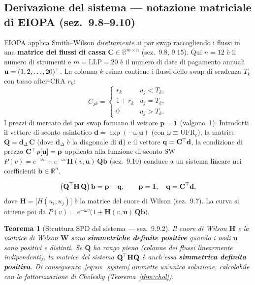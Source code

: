 \documentclass[11pt,a4paper]{article}
\theoremstyle{plain}
\newtheorem{teorema}{Teorema}[section]
\theoremstyle{definition}
\theoremstyle{remark}
\newcommand{\R}{\mathbb{R}}
\newcommand{\UFR}{\mathrm{UFR}}
\newcommand{\LLP}{\mathrm{LLP}}
\newcommand{\bfb}{\mathbf{b}}
\newcommand{\bfp}{\mathbf{p}}
\newcommand{\bfq}{\mathbf{q}}
\newcommand{\bfd}{\mathbf{d}}
\newcommand{\bfu}{\mathbf{u}}
\newcommand{\bfone}{\mathbf{1}}
\newcommand{\Wmat}{\mathbf{W}}
\newcommand{\Hmat}{\mathbf{H}}
\newcommand{\Cmat}{\mathbf{C}}
\newcommand{\Qmat}{\mathbf{Q}}
\newcommand{\transp}{^{\mskip-1mu\top}}
\begin{document}
\subsection{Derivazione del sistema --- notazione matriciale di EIOPA (sez.~9.8--9.10)}

EIOPA applica Smith--Wilson \emph{direttamente} ai par swap raccogliendo i flussi
in una \textbf{matrice dei flussi di cassa} $\Cmat\in\R^{m\times n}$ (sez.~9.8,
9.15). Qui $n=12$ è il numero di strumenti e $m=\LLP=20$ è il numero di date di
pagamento annuali $\bfu=(1,2,\ldots,20)\transp$. La colonna $k$-esima contiene i
flussi dello swap di scadenza $T_k$ con tasso after-CRA $r_k$:
\begin{equation}
  \label{eq:Cmat}
  C_{jk} = \begin{cases}
    r_k    & u_j < T_k,\\
    1 + r_k& u_j = T_k,\\
    0      & u_j > T_k.
  \end{cases}
\end{equation}
I prezzi di mercato dei par swap formano il vettore $\bfp=\bfone$ (valgono~1).
Introdotti il vettore di sconto asintotico $\bfd = \exp(-\omega\,\bfu)$
(con $\omega\equiv\UFR_c$), la matrice $\Qmat=\bfd_\Delta\,\Cmat$ (dove $\bfd_\Delta$
è la diagonale di $\bfd$) e il vettore $\bfq = \Cmat\transp\bfd$, la condizione di
prezzo $\Cmat\transp\,p[\bfu]=\bfp$ applicata alla funzione di sconto SW
$P(v)=e^{-\omega v}+e^{-\omega v}\Hmat(v,\bfu)\,\Qmat\bfb$ (sez.~9.10) conduce a un
sistema lineare nei coefficienti $\bfb\in\R^{n}$.

\begin{keybox}
\begin{equation}
  \label{eq:sw_system}
  \bigl(\Qmat\transp\Hmat\,\Qmat\bigr)\,\bfb = \bfp - \bfq,
  \qquad \bfp=\bfone,\quad \bfq=\Cmat\transp\bfd,
\end{equation}
dove $\Hmat=\bigl[H(u_i,u_j)\bigr]$ è la matrice del cuore di Wilson (sez.~9.7).
La curva si ottiene poi da $P(v)=e^{-\omega v}\bigl(1+\Hmat(v,\bfu)\,\Qmat\bfb\bigr)$.
\end{keybox}

\begin{teorema}[Struttura SPD del sistema --- sez.~9.9.2]
\label{thm:spd}
Il cuore di Wilson $\Hmat$ e la matrice di Wilson $\Wmat$ sono \textbf{simmetriche
definite positive} quando i nodi $\bfu$ sono positivi e distinti. Se $\Qmat$ ha
rango pieno (colonne dei flussi linearmente indipendenti), la matrice del sistema
$\Qmat\transp\Hmat\Qmat$ è anch'essa \textbf{simmetrica definita positiva}.
Di conseguenza~\eqref{eq:sw_system} ammette un'unica soluzione, calcolabile con la
fattorizzazione di Cholesky (Teorema~\ref{thm:chol}).
\end{teorema}
\end{document}
